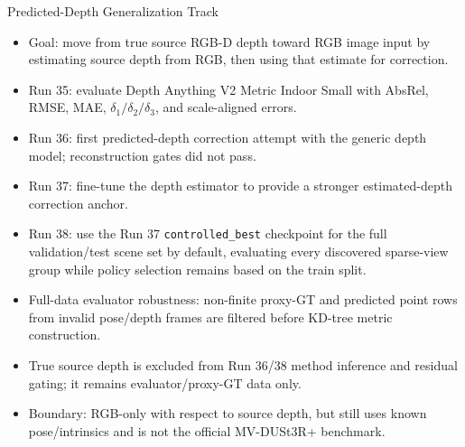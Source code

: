 \begin{frame}{Predicted-Depth Generalization Track}
  \scriptsize
  \begin{itemize}
    \item Goal: move from true source RGB-D depth toward RGB image input by
    estimating source depth from RGB, then using that estimate for correction.
    \item Run 35: evaluate Depth Anything V2 Metric Indoor Small with AbsRel,
    RMSE, MAE, \(\delta_1/\delta_2/\delta_3\), and scale-aligned errors.
    \item Run 36: first predicted-depth correction attempt with the generic
    depth model; reconstruction gates did not pass.
    \item Run 37: fine-tune the depth estimator to provide a stronger
    estimated-depth correction anchor.
    \item Run 38: use the Run 37 \texttt{controlled\_best} checkpoint for
    the full validation/test scene set by default, evaluating every discovered
    sparse-view group while policy selection remains based on the train split.
    \item Full-data evaluator robustness: non-finite proxy-GT and predicted
    point rows from invalid pose/depth frames are filtered before KD-tree metric
    construction.
    \item True source depth is excluded from Run 36/38 method inference and
    residual gating; it remains evaluator/proxy-GT data only.
    \item Boundary: RGB-only with respect to source depth, but still uses known
    pose/intrinsics and is not the official MV-DUSt3R+ benchmark.
  \end{itemize}
\end{frame}

